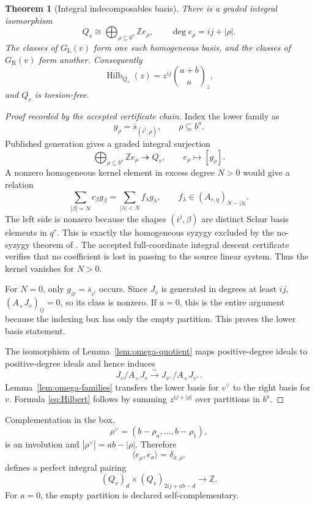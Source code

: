 \documentclass[11pt]{amsart}
\newtheorem{theorem}{Theorem}[section]
\theoremstyle{definition}
\theoremstyle{remark}
\newcommand{\Z}{\mathbb Z}
\newcommand{\Hilb}{\operatorname{Hilb}}
\newcommand{\GL}{G_{\mathrm L}}
\newcommand{\GR}{G_{\mathrm R}}
\newcommand{\ol}[1]{\overline{#1}}
\begin{document}
\begin{theorem}[Integral indecomposables basis]\label{thm:Q-basis}
There is a graded integral isomorphism
\begin{equation}\label{eq:Q-basis}
  Q_v\cong
  \bigoplus_{\rho\subseteq b^a}\Z e_\rho,
  \qquad
  \deg e_\rho=ij+|\rho|.
\end{equation}
The classes of $\GL(v)$ form one such homogeneous basis, and the classes of
$\GR(v)$ form another.  Consequently
\begin{equation}\label{eq:Hilbert}
  \Hilb_{Q_v}(z)
  =z^{ij}\binom{a+b}{a}_z,
\end{equation}
and $Q_v$ is torsion-free.
\end{theorem}

\begin{proof}[Proof recorded by the accepted certificate chain]
Index the lower family as
\[
  g_\rho=\ol{s}_{(i^j,\rho)},
  \qquad \rho\subseteq b^a.
\]
Published generation gives a graded integral surjection
\[
  \bigoplus_{\rho\subseteq b^a}\Z e_\rho\twoheadrightarrow Q_v,
  \qquad e_\rho\mapsto[g_\rho].
\]
A nonzero homogeneous kernel element in excess degree $N>0$ would give a
relation
\[
 \sum_{|\beta|=N}c_\beta g_\beta
 =\sum_{|\lambda|<N}f_\lambda g_\lambda,
 \qquad f_\lambda\in(A_{r,q})_{N-|\lambda|}.
\]
The left side is nonzero because the shapes $(i^j,\beta)$ are distinct Schur
basis elements in $q^r$.  This is exactly the homogeneous syzygy excluded by
the no-syzygy theorem of \cite{SDY}.  The accepted full-coordinate integral
descent certificate verifies that no coefficient is lost in passing to the
source linear system.  Thus the kernel vanishes for $N>0$.

For $N=0$, only $g_\varnothing=\ol{s}_{i^j}$ occurs.  Since $J_v$ is
generated in degrees at least $ij$, $(A_+J_v)_{ij}=0$, so its class is
nonzero.  If $a=0$, this is the entire argument because the indexing box has
only the empty partition.  This proves the lower basis statement.

The isomorphism of Lemma~\ref{lem:omega-quotient} maps positive-degree ideals
to positive-degree ideals and hence induces
\[
  J_v/A_+J_v\xrightarrow{\sim}
  J_{v^\vee}/A_+J_{v^\vee}.
\]
Lemma~\ref{lem:omega-families} transfers the lower basis for $v^\vee$ to the
right basis for $v$.  Formula \eqref{eq:Hilbert} follows by summing
$z^{ij+|\rho|}$ over partitions in $b^a$.
\end{proof}

Complementation in the box,
\[
  \rho^\vee=(b-\rho_a,\ldots,b-\rho_1),
\]
is an involution and $|\rho^\vee|=ab-|\rho|$.  Therefore
\[
  \langle e_\rho,e_\sigma\rangle
  =\delta_{\sigma,\rho^\vee}
\]
defines a perfect integral pairing
\[
  (Q_v)_d\times(Q_v)_{2ij+ab-d}\longrightarrow\Z.
\]
For $a=0$, the empty partition is declared self-complementary.
\end{document}
